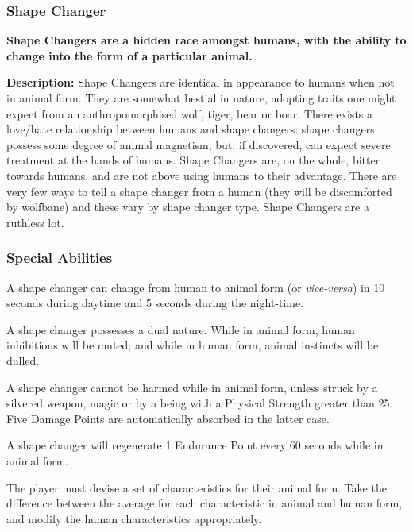 \begin{multicols*}{3}
\subsubsection{Shape Changer}

\textbf{Shape Changers are a hidden race amongst humans, with the
ability to change into the form of a particular animal.}

\textbf{Description:} Shape Changers are identical in appearance to
humans when not in animal form. They are somewhat bestial in nature,
adopting traits one might expect from an anthropomorphised wolf,
tiger, bear or boar. There exists a love/hate relationship between
humans and shape changers: shape changers possess some degree of
animal magnetism, but, if discovered, can expect severe treatment at
the hands of humans. Shape Changers are, on the whole, bitter towards
humans, and are not above using humans to their advantage. There are
very few ways to tell a shape changer from a human (\eg they will be
discomforted by wolfbane) and these vary by shape changer type. Shape
Changers are a ruthless lot.

\subsubsection{Special Abilities}

\begin{Enumerate}
\item
A shape changer can change from human to animal form (or
\emph{vice-versa}) in 10 seconds during daytime and 5 seconds during
the night-time.

\item
A shape changer possesses a dual nature. While in animal form, human
inhibitions will be muted; and while in human form, animal instincts
will be dulled.

\item
A shape changer cannot be harmed while in animal form, unless struck
by a silvered weapon, magic or by a being with a Physical Strength
greater than 25. Five Damage Points are automatically absorbed in the
latter case.

\item
A shape changer will regenerate 1 Endurance Point every 60 seconds
while in animal form.

\item
The player must devise a set of characteristics for their animal
form. Take the difference between the average for each characteristic
in animal and human form, and modify the human characteristics
appropriately.


\end{Enumerate}
\end{multicols*}
